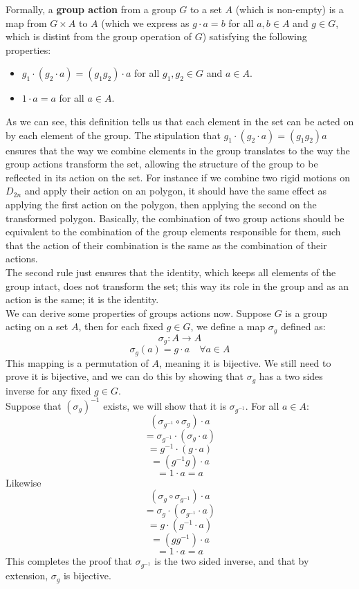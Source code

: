 \documentclass[12pt]{article}
\begin{document}
    Formally, a \textbf{group action} from a group $G$
    to a set $A$ (which is non-empty) is a map from
    $G \times A$ to $A$
    (which we express as $g \cdot a = b$
    for all $a, b \in A$ and $g \in G$,
    which is distint from the group operation of $G$)
    satisfying the following properties:
    \begin{itemize}[label=$\diamond$]
        \item
            $g_1 \cdot (g_2 \cdot a) = (g_1g_2) \cdot a$
            for all $g_1, g_2 \in G$ and $a \in A$.
        \item 
            $1 \cdot a = a$ for all $a \in A$.
    \end{itemize}
    As we can see, this definition tells us that each element
    in the set can be acted on by each element of the group.
    The stipulation that $g_1 \cdot (g_2 \cdot a) = (g_1g_2)a$
    ensures that the way we combine elements in the group
    translates to the way the group actions transform the set,
    allowing the structure of the group to be reflected in
    its action on the set. 
    For instance if we combine two rigid motions on $D_{2n}$
    and apply their action on an polygon,
    it should have the same effect as applying the first action
    on the polygon, then applying the second on the transformed polygon.
    Basically, the combination of two group actions 
    should be equivalent to the combination of the group elements
    responsible for them,
    such that the action of their combination is
    the same as the combination of their actions. \\
    The second rule just ensures that the identity,
    which keeps all elements of the group intact,
    does not transform the set;
    this way its role in the group and as an action is the same;
    it is the identity. \\

    We can derive some properties of groups actions now.
    Suppose $G$ is a group acting on a set $A$,
    then for each fixed $g \in G$,
    we define a map $\sigma_g$ defined as:
    \[ \sigma_g: A \to A \]
    \[ \sigma_g(a) = g \cdot a \quad \forall a \in A \]
    This mapping is a permutation of $A$,
    meaning it is bijective.
    We still need to prove it is bijective,
    and we can do this by showing that $\sigma_g$
    has a two sides inverse for any fixed $g \in G$. \\
    Suppose that $(\sigma_g)^{-1}$ exists,
    we will show that it is $\sigma_{g^{-1}}$.
    For all $a \in A$:
    \[ (\sigma_{g^{-1}} \circ \sigma_g) \cdot a \]
    \[ = \sigma_{g^{-1}} \cdot (\sigma_g \cdot a) \]
    \[ = g^{-1} \cdot (g \cdot a) \]
    \[ = (g^{-1}g) \cdot a \]
    \[ = 1 \cdot a = a \]
    Likewise
    \[ (\sigma_g \circ \sigma_{g^{-1}}) \cdot a \]
    \[ = \sigma_g \cdot (\sigma_{g^{-1}} \cdot a) \]
    \[ = g \cdot (g^{-1} \cdot a) \]
    \[ = (gg^{-1}) \cdot a \]
    \[ = 1 \cdot a = a \]
    This completes the proof that $\sigma_{g^{-1}}$ is
    the two sided inverse,
    and that by extension, $\sigma_g$ is bijective. \\
\end{document}
